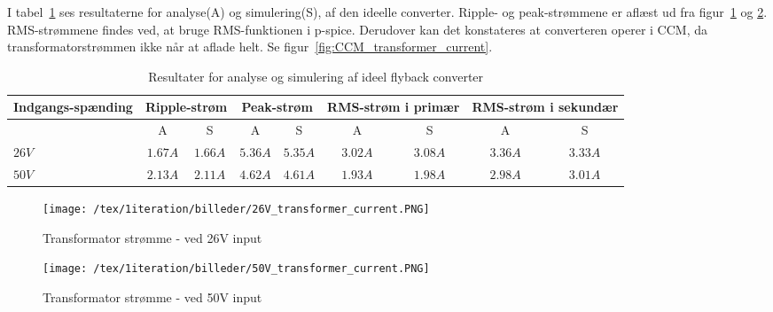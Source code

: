 \noindent I tabel~\ref{tab:result_ideal_converter} ses resultaterne for analyse(A) og simulering(S), af den ideelle converter. Ripple- og peak-strømmene er aflæst ud fra figur~\ref{fig:26V_transformer_current} og \ref{fig:50V_transformer_current}. RMS-strømmene findes ved, at bruge RMS-funktionen i p-spice. Derudover kan det konstateres at converteren operer i CCM, da transformatorstrømmen ikke når at aflade helt. Se figur~\ref{fig:CCM_transformer_current}. 

\begin{table}[H] 			
	\centering
	\begin{tabularx}{\textwidth}{|X|c|c|c|c|c|c|c|c|}
		\hline
		\textbf{Indgangs-spænding} & \multicolumn{2}{|X|}{\textbf{Ripple-strøm}} & \multicolumn{2}{|X|}{\textbf{Peak-strøm}} & \multicolumn{2}{|X|}{\textbf{RMS-strøm i primær}} & \multicolumn{2}{|X|}{\textbf{RMS-strøm i sekundær}} \\ \hline
		& A & S & A & S & A & S & A & S \\ \hline
		$26V$ & $1.67A$ & $1.66A$ & $5.36A$ & $5.35A$ & $3.02A$ & $3.08A$ & $3.36A$ & $3.33A$ \\ \hline 
		$50V$ & $2.13A$ & $2.11A$ & $4.62A$ & $4.61A$ & $1.93A$ & $1.98A$ & $2.98A$ & $3.01A$ \\ \hline
	\end{tabularx}
	\caption{Resultater for analyse og simulering af ideel flyback converter}
	\label{tab:result_ideal_converter}
\end{table}

\begin{figure}[H]
	\center
	\texttt{[image: /tex/1iteration/billeder/26V\_transformer\_current.PNG]}
	\caption{Transformator strømme - ved 26V input}
	\label{fig:26V_transformer_current}
\end{figure}

\begin{figure}[H]
	\center
	\texttt{[image: /tex/1iteration/billeder/50V\_transformer\_current.PNG]}
	\caption{Transformator strømme - ved 50V input}
	\label{fig:50V_transformer_current}
\end{figure}




